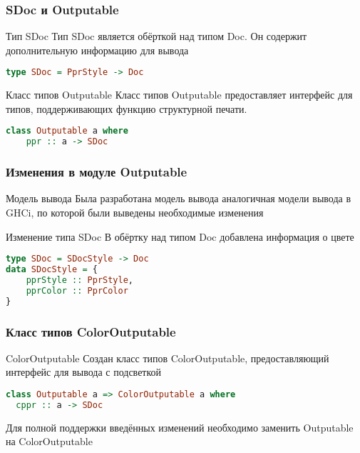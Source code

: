 \documentclass[utf8,russian]{beamer}
\begin{document}
\begin{frame}[fragile]
\frametitle{SDoc и Outputable}

\begin{block}{Тип SDoc}
Тип SDoc является обёрткой над типом Doc. Он содержит дополнительную информацию для вывода
\begin{lstlisting}[language=Haskell]
type SDoc = PprStyle -> Doc
\end{lstlisting}
\end{block}

\begin{block}{Класс типов Outputable}
Класс типов Outputable предоставляет интерфейс для типов, поддерживающих функцию структурной печати.
\begin{lstlisting}[language=Haskell]
class Outputable a where
	ppr :: a -> SDoc
\end{lstlisting}
\end{block}

\end{frame}

\begin{frame}[fragile]
\frametitle{Изменения в модуле Outputable}

\begin{block}{Модель вывода}
Была разработана модель вывода аналогичная модели вывода в GHCi, по которой были выведены необходимые изменения
\end{block}

\begin{block}{Изменение типа SDoc}
В обёртку над типом Doc добавлена информация о цвете
\begin{lstlisting}[language=Haskell]
type SDoc = SDocStyle -> Doc
data SDocStyle = {
    pprStyle :: PprStyle,
    pprColor :: PprColor
}
\end{lstlisting}
\end{block}
\end{frame}

\begin{frame}[fragile]
\frametitle{Класс типов ColorOutputable}

\begin{block}{ColorOutputable}
Создан класс типов ColorOutputable, предоставляющий интерфейс для вывода с подсветкой
\begin{lstlisting}[language=Haskell]
class Outputable a => ColorOutputable a where
  cppr :: a -> SDoc
\end{lstlisting}
\end{block}

\begin{block}{}
Для полной поддержки введённых изменений необходимо заменить Outputable на ColorOutputable
\end{block}

\end{frame}
\end{document}
